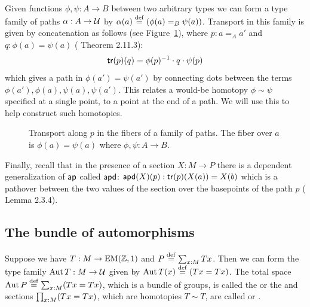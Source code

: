 Given functions \( \phi,\psi:A\to B \) between two arbitrary types we can form a type family of paths \( \alpha:A\to\mathcal{U} \) by \( \alpha(a)\stackrel{\mathrm{def}}{=}(\phi(a)=_B\psi(a)) \). Transport in this family is given by concatenation as follows (see Figure~\ref{fig:transport_family_of_paths}), where \( p:a=_A a' \) and \( q:\phi(a)=\psi(a) \) (\cite{hottbook} Theorem 2.11.3):
\[ 
\mathsf{tr}(p)(q) = \phi(p)^{-1}\cdot q\cdot \psi(p)
\]
which gives a path in \( \phi(a')=\psi(a') \) by connecting dots between the terms \( \phi(a'), \phi(a), \psi(a), \psi(a') \). This relates a would-be homotopy \( \phi\sim\psi \) specified at a single point, to a point at the end of a path. We will use this to help construct such homotopies.
\begin{figure}[h]
\centering
{}
\caption{Transport along \( p \) in the fibers of a family of paths. The fiber over \( a \) is \( \phi(a)=\psi(a) \) where \( \phi,\psi:A\to B \).}
\label{fig:transport_family_of_paths}
\end{figure}

Finally, recall that in the presence of a section \( X:M\to P \) there is a dependent generalization of \( \mathsf{ap} \) called \( \mathsf{apd} \): \( \mathsf{apd}(X)(p):\mathsf{tr}(p)(X(a))=X(b) \) which is a pathover between the two values of the section over the basepoints of the path \( p \) (\cite{hottbook} Lemma 2.3.4).

\subsection{The bundle of automorphisms}
\label{sec:automorphisms}
\begin{mydef}
Suppose we have \( T:M\to\mathrm{EM}(\mathbb{Z},1) \) and \( P\stackrel{\mathrm{def}}{=}\sum_{x:M}Tx \). Then we can form the type family \( \operatorname{Aut} T:M\to\mathcal{U} \) given by \( \operatorname{Aut} T(x)\stackrel{\mathrm{def}}{=}(Tx=Tx) \). The total space \( \operatorname{Aut} P\stackrel{\mathrm{def}}{=}\sum_{x:M}(Tx=Tx) \), which is a bundle of groups, is called the  or the  and sections \( \prod_{x:M}(Tx=Tx) \), which are homotopies \( T\sim T \), are called  or .
\end{mydef}

